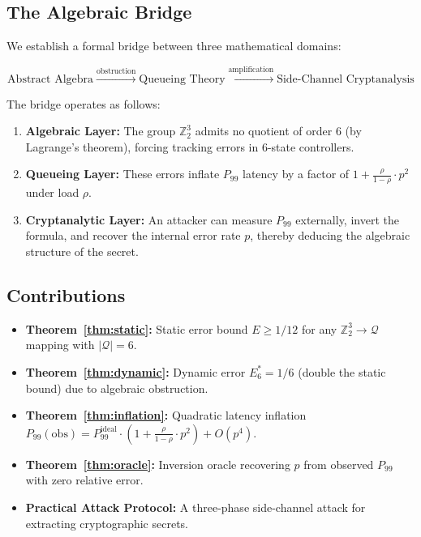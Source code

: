 \documentclass[11pt]{article}
\begin{document}
\subsection{The Algebraic Bridge}

We establish a formal bridge between three mathematical domains:

$$\boxed{\text{Abstract Algebra} \xrightarrow{\text{obstruction}} \text{Queueing Theory} \xrightarrow{\text{amplification}} \text{Side-Channel Cryptanalysis}}$$

The bridge operates as follows:
\begin{enumerate}
    \item \textbf{Algebraic Layer:} The group $\mathbb{Z}_2^3$ admits no quotient of order 6 (by Lagrange's theorem), forcing tracking errors in 6-state controllers.
    \item \textbf{Queueing Layer:} These errors inflate $P_{99}$ latency by a factor of $1 + \frac{\rho}{1-\rho} \cdot p^2$ under load $\rho$.
    \item \textbf{Cryptanalytic Layer:} An attacker can measure $P_{99}$ externally, invert the formula, and recover the internal error rate $p$, thereby deducing the algebraic structure of the secret.
\end{enumerate}

\subsection{Contributions}

\begin{itemize}
    \item \textbf{Theorem~\ref{thm:static}:} Static error bound $E \geq 1/12$ for any $\mathbb{Z}_2^3 \to \mathcal{Q}$ mapping with $|\mathcal{Q}| = 6$.
    \item \textbf{Theorem~\ref{thm:dynamic}:} Dynamic error $E_6^* = 1/6$ (double the static bound) due to algebraic obstruction.
    \item \textbf{Theorem~\ref{thm:inflation}:} Quadratic latency inflation $P_{99}(\text{obs}) = P_{99}^{\text{ideal}} \cdot (1 + \frac{\rho}{1-\rho} \cdot p^2) + O(p^4)$.
    \item \textbf{Theorem~\ref{thm:oracle}:} Inversion oracle recovering $p$ from observed $P_{99}$ with zero relative error.
    \item \textbf{Practical Attack Protocol:} A three-phase side-channel attack for extracting cryptographic secrets.
\end{itemize}
\end{document}
